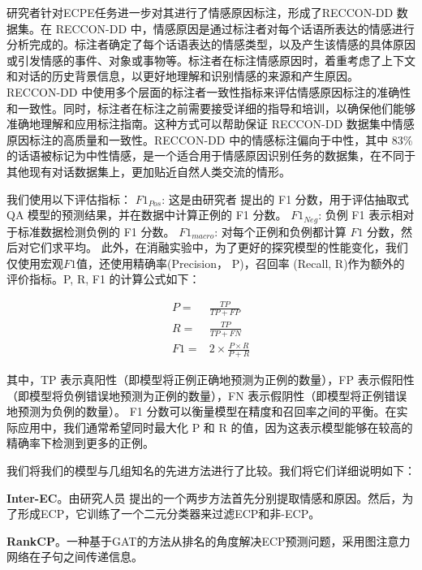 研究者\cite{reccon}针对ECPE任务进一步对其进行了情感原因标注，形成了RECCON-DD 数据集。在 RECCON-DD 中，情感原因是通过标注者对每个话语所表达的情感进行分析完成的。标注者确定了每个话语表达的情感类型，以及产生该情感的具体原因或引发情感的事件、对象或事物等。标注者在标注情感原因时，着重考虑了上下文和对话的历史背景信息，以更好地理解和识别情感的来源和产生原因。
 RECCON-DD 中使用多个层面的标注者一致性指标来评估情感原因标注的准确性和一致性。同时，标注者在标注之前需要接受详细的指导和培训，以确保他们能够准确地理解和应用标注指南。这种方式可以帮助保证 RECCON-DD 数据集中情感原因标注的高质量和一致性。RECCON-DD 中的情感标注偏向于中性，其中 83\% 的话语被标记为中性情感，是一个适合用于情感原因识别任务的数据集，在不同于其他现有对话数据集上，更加贴近自然人类交流的情形。


我们使用以下评估指标：
\textbf{$F1_{Pos}$}: 这是由研究者\cite{rajpurkar2016squad} 提出的 F1 分数，用于评估抽取式 QA 模型的预测结果，并在数据中计算正例的 F1 分数。
\textbf{$F1_{Neg}$}: 负例 F1 表示相对于标准数据检测负例的 F1 分数。
\textbf{$F1_{macro}$}: 对每个正例和负例都计算 $F1$ 分数，然后对它们求平均。
此外，在消融实验中，为了更好的探究模型的性能变化，我们仅使用宏观$F1$值，还使用精确率(Precision， P)，召回率 (Recall, R)作为额外的评价指标。P, R, F1 的计算公式如下：

\begin{equation}
\begin{aligned}
P = & \frac{TP}{TP+FP} \\
R = & \frac{TP}{TP+FN} \\
F1 = & 2 \times \frac{P \times R}{P+R}
\end{aligned}
\end{equation}
\vspace{6pt}

其中，TP 表示真阳性（即模型将正例正确地预测为正例的数量），FP 表示假阳性（即模型将负例错误地预测为正例的数量），FN 表示假阴性（即模型将正例错误地预测为负例的数量）。
F1 分数可以衡量模型在精度和召回率之间的平衡。在实际应用中，我们通常希望同时最大化 P 和 R 的值，因为这表示模型能够在较高的精确率下检测到更多的正例。



我们将我们的模型与几组知名的先进方法进行了比较。我们将它们详细说明如下：

\textbf{Inter-EC}。由研究人员\cite{DBLP:conf/acl/XiaD19} 提出的一个两步方法首先分别提取情感和原因。然后，为了形成ECP，它训练了一个二元分类器来过滤ECP和非-ECP。

\textbf{RankCP}。一种基于GAT的方法\cite{wei-etal-2020-effective}从排名的角度解决ECP预测问题，采用图注意力网络在子句之间传递信息。

